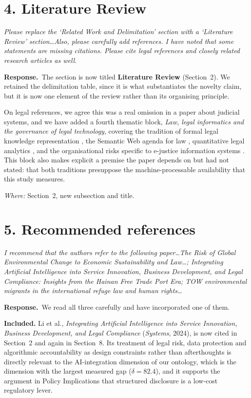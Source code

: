 \documentclass[11pt,a4paper]{article}
\newenvironment{comment}
  {\begin{mdframed}[backgroundcolor=cmtbg, linecolor=cmtrule, linewidth=0.6pt,
     innertopmargin=5pt, innerbottommargin=5pt, innerleftmargin=7pt,
     innerrightmargin=7pt, skipabove=4pt, skipbelow=6pt]\itshape}
  {\end{mdframed}}
\newcommand{\resp}{\par\noindent\textbf{Response.}\ }
\newcommand{\done}[1]{\par\vspace{2pt}\noindent\textit{Where:} #1\par\vspace{4pt}}
\begin{document}
\section*{4. Literature Review}
\begin{comment}
Please replace the `Related Work and Delimitation' section with a `Literature Review' section\dots Also, please carefully add references. I have noted that some statements are missing citations. Please cite legal references and closely related research articles as well.
\end{comment}
\resp The section is now titled \textbf{Literature Review} (Section~2). We retained the delimitation table, since it is what substantiates the novelty claim, but it is now one element of the review rather than its organising principle.

On legal references, we agree this was a real omission in a paper about judicial systems, and we have added a fourth thematic block, \emph{Law, legal informatics and the governance of legal technology}, covering the tradition of formal legal knowledge representation \cite{BenchCapon2012}, the Semantic Web agenda for law \cite{Casanovas2016}, quantitative legal analytics \cite{Katz2017}, and the organisational risks specific to e-justice information systems \cite{Rosa2013}. This block also makes explicit a premise the paper depends on but had not stated: that both traditions presuppose the machine-processable availability that this study measures.
\done{Section~2, new subsection and title.}

\section*{5. Recommended references}
\begin{comment}
I recommend that the authors refer to the following paper\dots \emph{The Risk of Global Environmental Change to Economic Sustainability and Law\dots}; \emph{Integrating Artificial Intelligence into Service Innovation, Business Development, and Legal Compliance: Insights from the Hainan Free Trade Port Era}; \emph{TOW environmental migrants in the international refuge law and human rights\dots}
\end{comment}
\resp We read all three carefully and have incorporated one of them.

\textbf{Included.} Li et al., \emph{Integrating Artificial Intelligence into Service Innovation, Business Development, and Legal Compliance} (\emph{Systems}, 2024), is now cited in Section~2 and again in Section~8. Its treatment of legal risk, data protection and algorithmic accountability as design constraints rather than afterthoughts is directly relevant to the AI-integration dimension of our ontology, which is the dimension with the largest measured gap ($\delta=82.4$), and it supports the argument in Policy Implications that structured disclosure is a low-cost regulatory lever.
\end{document}
